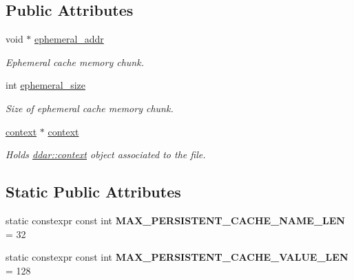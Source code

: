 \subsection*{\-Public \-Attributes}
\begin{DoxyCompactItemize}
\item 
void $\ast$ \hyperlink{classddar_1_1metadata_adae2c43de47db6d2c97d59231e6e7d0f}{ephemeral\-\_\-addr}
\begin{DoxyCompactList}\small\item\em \-Ephemeral cache memory chunk. \end{DoxyCompactList}\item 
\hypertarget{classddar_1_1metadata_aa8bb4d26891dc1128725bd004c6e9a2a}{int \hyperlink{classddar_1_1metadata_aa8bb4d26891dc1128725bd004c6e9a2a}{ephemeral\-\_\-size}}\label{classddar_1_1metadata_aa8bb4d26891dc1128725bd004c6e9a2a}

\begin{DoxyCompactList}\small\item\em \-Size of ephemeral cache memory chunk. \end{DoxyCompactList}\item 
\hypertarget{classddar_1_1metadata_a4c1add585adf08e05d862f4e6b801560}{\hyperlink{classddar_1_1context}{context} $\ast$ \hyperlink{classddar_1_1metadata_a4c1add585adf08e05d862f4e6b801560}{context}}\label{classddar_1_1metadata_a4c1add585adf08e05d862f4e6b801560}

\begin{DoxyCompactList}\small\item\em \-Holds \hyperlink{classddar_1_1context}{ddar\-::context} object associated to the file. \end{DoxyCompactList}\end{DoxyCompactItemize}
\subsection*{\-Static \-Public \-Attributes}
\begin{DoxyCompactItemize}
\item 
\hypertarget{classddar_1_1metadata_a05546ee6284ed1a7ad24f6c7d2d2ba55}{static constexpr const int {\bfseries \-M\-A\-X\-\_\-\-P\-E\-R\-S\-I\-S\-T\-E\-N\-T\-\_\-\-C\-A\-C\-H\-E\-\_\-\-N\-A\-M\-E\-\_\-\-L\-E\-N} = 32}\label{classddar_1_1metadata_a05546ee6284ed1a7ad24f6c7d2d2ba55}

\item 
\hypertarget{classddar_1_1metadata_afcfa157acf61b2b0ff17b07f2efe0c80}{static constexpr const int {\bfseries \-M\-A\-X\-\_\-\-P\-E\-R\-S\-I\-S\-T\-E\-N\-T\-\_\-\-C\-A\-C\-H\-E\-\_\-\-V\-A\-L\-U\-E\-\_\-\-L\-E\-N} = 128}\label{classddar_1_1metadata_afcfa157acf61b2b0ff17b07f2efe0c80}

\end{DoxyCompactItemize}



